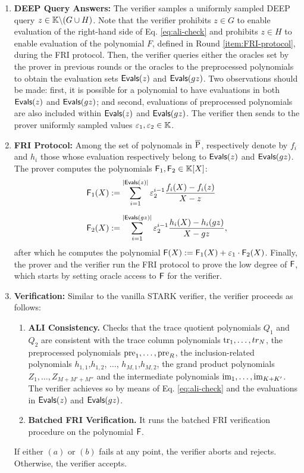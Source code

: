 \begin{protocol}
\begin{enumerate}
  \item \textbf{DEEP Query Answers:} The verifier samples a uniformly sampled DEEP query $z \in \mathbb{K} \backslash (G \cup H)$. Note that the verifier prohibits $z \in G$ to enable evaluation of the right-hand side of Eq. \eqref{eq:ali-check} and prohibits $z \in H$ to enable evaluation of the polynomial $F$, defined in Round \ref{item:FRI-protocol}, during the FRI protocol.
  Then, the verifier queries either the oracles set by the prover in previous rounds or the oracles to the preprocessed polynomials to obtain the evaluation sets $\textsf{Evals}(z)$ and $\textsf{Evals}(gz)$. Two observations should be made: first, it is possible for a polynomial to have evaluations in both $\textsf{Evals}(z)$ and $\textsf{Evals}(gz)$; and second, evaluations of preprocessed polynomials are also included within $\textsf{Evals}(z)$ and $\textsf{Evals}(gz)$. The verifier then sends to the prover uniformly sampled values $\varepsilon_1,\varepsilon_2 \in \mathbb{K}$.
  
  \item \textbf{FRI Protocol:} Among the set of polynomals in $\overline{\text{P}}$, respectively denote by $f_i$ and $h_i$ those whose evaluation respectively belong to $\textsf{Evals}(z)$ and $\textsf{Evals}(gz)$. The prover computes the polynomials $\textsf{F}_1,\textsf{F}_2 \in \mathbb{K}[X]$:
  \begin{align*}
    \textsf{F}_1(X) &:= \sum_{i = 1}^{|\textsf{Evals}(z)|} \varepsilon_2^{i-1} \frac{f_i(X) - f_i(z)}{X-z} \\[0.2cm]
    \textsf{F}_2(X) &:= \sum_{i = 1}^{|\textsf{Evals}(gz)|} \varepsilon_2^{i-1} \frac{h_i(X) - h_i(gz)}{X-gz},
  \end{align*}
  after which he computes the polynomial $\textsf{F}(X) := \textsf{F}_1(X) + \varepsilon_1 \cdot \textsf{F}_2(X)$. Finally, the prover and the verifier run the FRI protocol to prove the low degree of $\textsf{F}$, which starts by setting oracle access to $\textsf{F}$ for the verifier. \label{item:FRI-protocol}

  \item \textbf{Verification:} Similar to the vanilla STARK verifier, the verifier proceeds as follows:
  \begin{enumerate}
    \item \textbf{ALI Consistency.} Checks that the trace quotient polynomials $Q_1$ and $Q_2$ are consistent with the trace column polynomials $\text{tr}_1,\dots,tr_N$, the preprocessed polynomials $\text{pre}_1,\dots,\text{pre}_R$, the inclusion-related polynomials $h_{1,1}$,$h_{1,2}$, $\dots$, $h_{M,1}$,$h_{M,2}$, the grand product polynomials $Z_1, \dots, Z_{M+M'+M''}$ and the intermediate polynomials $\text{im}_1,\dots,\text{im}_{K+K'}$. The verifier achieves so by means of Eq. \eqref{eq:ali-check} and the evaluations in $\textsf{Evals}(z)$ and $\textsf{Evals}(gz)$.
    \item \textbf{Batched FRI Verification.} It runs the batched FRI verification procedure on the polynomial $\textsf{F}$.
  \end{enumerate}
  
  If either $(a)$ or $(b)$ fails at any point, the verifier aborts and rejects. Otherwise, the verifier accepts.
\end{enumerate}
\end{protocol}





